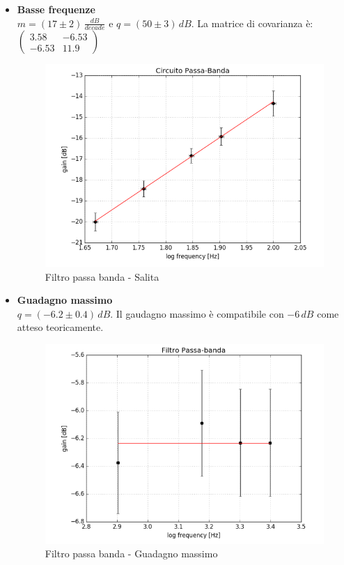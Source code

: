 \documentclass[10pt,a4paper]{article}
\begin{document}
\begin{itemize}
\item \textbf{Basse frequenze}\\
$ m = (17 \pm 2) \, \frac{dB}{decade}$ e $q = (50 \pm 3) \, dB$. La matrice di covarianza è: 
$\left(\begin{array}{cc}
3.58 & -6.53 \\ 
-6.53 & 11.9
\end{array} \right)$

\begin{figure}[h]
\centering
\includegraphics[scale=0.4]{immagine6.png}
\caption{Filtro passa banda - Salita}
\end{figure}

\item \textbf{Guadagno massimo}\\
$q = (-6.2 \pm 0.4) \, dB$. Il gaudagno massimo è compatibile con $-6 \, dB$ come atteso teoricamente.

\begin{figure}[h]
\centering
\includegraphics[scale=0.4]{immagine7.png}
\caption{Filtro passa banda - Guadagno massimo}
\end{figure}


\end{itemize}
\end{document}
